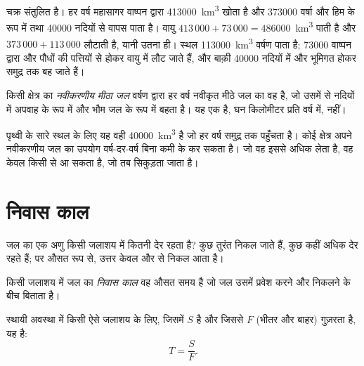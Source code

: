 चक्र संतुलित है। हर वर्ष महासागर वाष्पन द्वारा \num{413000}~\unit{km^3} खोता है
और \num{373000} वर्षा और हिम के रूप में तथा \num{40000} नदियों से
वापस पाता है। वायु $413\,000 + 73\,000 = \num{486000}$~\unit{km^3}
पाती है और $373\,000 + 113\,000$ लौटाती है, यानी उतना ही। स्थल
\num{113000}~\unit{km^3} वर्षण पाता है; \num{73000} वाष्पन द्वारा और पौधों की
पत्तियों से होकर वायु में लौट जाते हैं, और बाक़ी \num{40000}
नदियों में और भूमिगत होकर समुद्र तक बह जाते हैं।

\begin{definition}[नवीकरणीय मीठा जल]\label{def:g10:freshwater-resources:renewable}
किसी क्षेत्र का \emph{नवीकरणीय मीठा जल}
वर्षण द्वारा हर वर्ष नवीकृत मीठे जल का वह  है, जो
उसमें से नदियों में अपवाह के रूप में और भौम जल के रूप में बहता है। यह एक  है, घन
किलोमीटर प्रति वर्ष में,  नहीं।
\end{definition}

पृथ्वी के सारे स्थल के लिए यह वही \num{40000}~\unit{km^3} है जो हर वर्ष
समुद्र तक पहुँचता है। कोई क्षेत्र अपने नवीकरणीय जल का उपयोग वर्ष-दर-वर्ष
बिना कमी के कर सकता है। जो वह इससे अधिक लेता है, वह केवल किसी  से आ सकता है,
जो तब सिकुड़ता जाता है।

\section{निवास काल}

जल का एक अणु किसी जलाशय में कितनी देर रहता है? कुछ तुरंत निकल जाते हैं,
कुछ कहीं अधिक देर रहते हैं; पर औसत रूप से, उत्तर केवल  और
 से निकल आता है।

\begin{definition}[निवास काल]\label{def:g10:freshwater-resources:residence-time}
किसी जलाशय में जल का \emph{निवास काल} वह
औसत समय है जो जल उसमें प्रवेश करने और निकलने के बीच बिताता है।
\end{definition}

\begin{proposition}[निवास काल, भंडार और अभिवाह]\label{prop:g10:freshwater-resources:residence}
स्थायी अवस्था में किसी ऐसे जलाशय के लिए, जिसमें  $S$ है और जिससे  $F$
(भीतर और बाहर) गुज़रता है,  यह है:
\[
T = \frac{S}{F}.
\]
\end{proposition}

